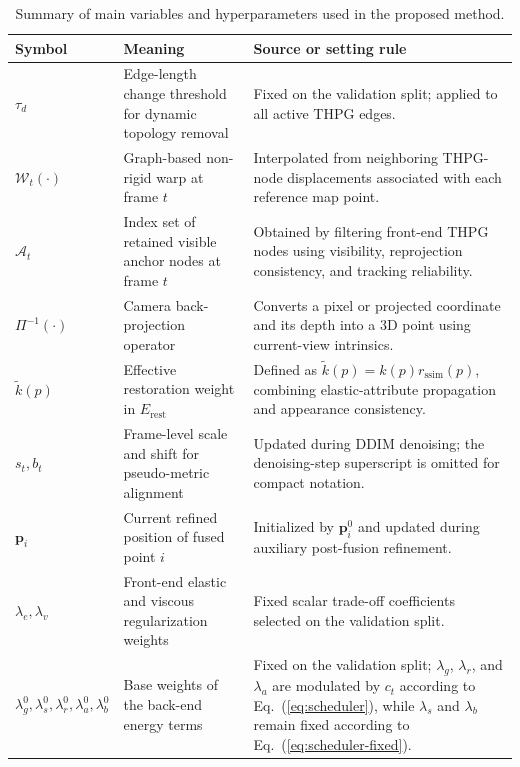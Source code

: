 \documentclass[pdflatex,sn-mathphys-num]{sn-jnl}
\begin{document}
\clearpage
\setcounter{table}{1}
\begin{table}[p]
\centering
\caption{Summary of main variables and hyperparameters used in the proposed method.}
\label{tab:notation_params}
\begingroup
\scriptsize
\setlength{\tabcolsep}{3pt}
\renewcommand{\arraystretch}{0.92}
\begin{tabular}{>{\raggedright\arraybackslash}p{}>{\raggedright\arraybackslash}p{}>{\raggedright\arraybackslash}p{}}
\toprule
Symbol & Meaning & Source or setting rule \\
\midrule
$\tau_d$ & Edge-length change threshold for dynamic topology removal & Fixed on the validation split; applied to all active THPG edges. \\
$\mathcal{W}_t(\cdot)$ & Graph-based non-rigid warp at frame $t$ & Interpolated from neighboring THPG-node displacements associated with each reference map point. \\
$\mathcal{A}_t$ & Index set of retained visible anchor nodes at frame $t$ & Obtained by filtering front-end THPG nodes using visibility, reprojection consistency, and tracking reliability. \\
$\Pi^{-1}(\cdot)$ & Camera back-projection operator & Converts a pixel or projected coordinate and its depth into a 3D point using current-view intrinsics. \\
$\tilde{k}(p)$ & Effective restoration weight in $E_{\mathrm{rest}}$ & Defined as $\tilde{k}(p)=k(p)r_{\mathrm{ssim}}(p)$, combining elastic-attribute propagation and appearance consistency. \\
$s_t,b_t$ & Frame-level scale and shift for pseudo-metric alignment & Updated during DDIM denoising; the denoising-step superscript is omitted for compact notation. \\
$\mathbf{p}_i$ & Current refined position of fused point $i$ & Initialized by $\mathbf{p}_i^0$ and updated during auxiliary post-fusion refinement. \\
$\lambda_e,\lambda_v$ & Front-end elastic and viscous regularization weights & Fixed scalar trade-off coefficients selected on the validation split. \\
$\lambda_g^0,\lambda_s^0,\lambda_r^0,\lambda_a^0,\lambda_b^0$ & Base weights of the back-end energy terms & Fixed on the validation split; $\lambda_g$, $\lambda_r$, and $\lambda_a$ are modulated by $c_t$ according to Eq.~(\ref{eq:scheduler}), while $\lambda_s$ and $\lambda_b$ remain fixed according to Eq.~(\ref{eq:scheduler-fixed}). \\

\end{tabular}
\end{table}
\end{document}
